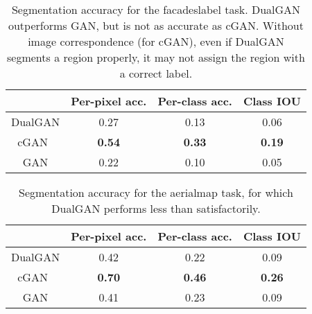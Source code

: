 \tabcolsep=0.11cm
\begin{table}
\begin{center}
\begin{tabular}{|c|c|c|c|}
\hline
  & Per-pixel acc.  & Per-class acc. & Class IOU\\
\hline\hline
DualGAN &  0.27 &  0.13 & 0.06\\      
\hline
cGAN~\cite{isola2016image}  &  \textbf{0.54}&  \textbf{0.33} &\textbf{0.19}\\  
\hline
GAN &   0.22&   0.10 & 0.05 \\
\hline
\end{tabular}
\caption{Segmentation accuracy for the facadeslabel task. DualGAN outperforms GAN, but is not as accurate as cGAN. 
Without image correspondence (for cGAN), even if DualGAN segments a region properly, it may not assign the region with a 
correct label.} \label{table:acc}
\end{center}
\end{table}


\tabcolsep=0.11cm
\begin{table}
\begin{center}
\begin{tabular}{|c|c|c|c|}
\hline
  & Per-pixel acc.  & Per-class acc. & Class IOU\\
\hline\hline
DualGAN &  0.42 &  0.22 & 0.09\\      
\hline
cGAN~\cite{isola2016image}  &  \textbf{0.70}&  \textbf{0.46} &\textbf{0.26}\\  
\hline
GAN &   0.41&   0.23 & 0.09 \\
\hline
\end{tabular}
\caption{Segmentation accuracy for the aerialmap task, for which DualGAN performs less than 
satisfactorily.} \label{table:acc_maps}
\end{center}
\end{table}


